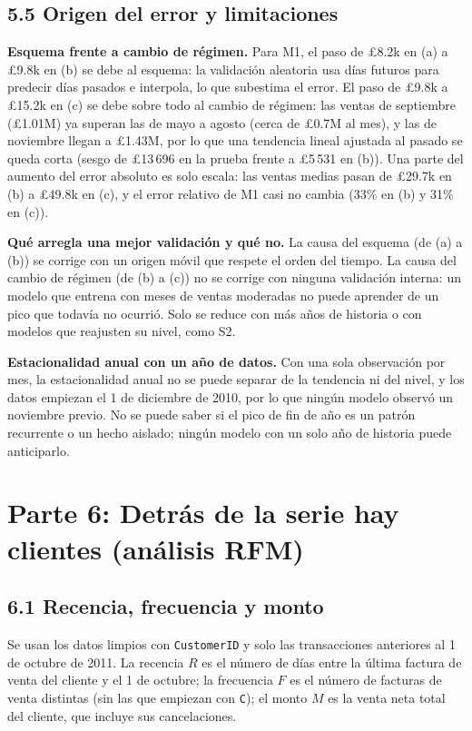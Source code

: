 \documentclass[11pt]{article}
\begin{document}
\subsection*{5.5 Origen del error y limitaciones}
\textbf{Esquema frente a cambio de régimen.} Para M1, el paso de \pounds{}8.2k en (a) a \pounds{}9.8k en (b) se debe al esquema: la validación aleatoria usa días futuros para predecir días pasados e interpola, lo que subestima el error. El paso de \pounds{}9.8k a \pounds{}15.2k en (c) se debe sobre todo al cambio de régimen: las ventas de septiembre (\pounds{}1.01M) ya superan las de mayo a agosto (cerca de \pounds{}0.7M al mes), y las de noviembre llegan a \pounds{}1.43M, por lo que una tendencia lineal ajustada al pasado se queda corta (sesgo de \pounds{}13\,696 en la prueba frente a \pounds{}5\,531 en (b)). Una parte del aumento del error absoluto es solo escala: las ventas medias pasan de \pounds{}29.7k en (b) a \pounds{}49.8k en (c), y el error relativo de M1 casi no cambia (33\% en (b) y 31\% en (c)).

\textbf{Qué arregla una mejor validación y qué no.} La causa del esquema (de (a) a (b)) se corrige con un origen móvil que respete el orden del tiempo. La causa del cambio de régimen (de (b) a (c)) no se corrige con ninguna validación interna: un modelo que entrena con meses de ventas moderadas no puede aprender de un pico que todavía no ocurrió. Solo se reduce con más años de historia o con modelos que reajusten su nivel, como S2.

\textbf{Estacionalidad anual con un año de datos.} Con una sola observación por mes, la estacionalidad anual no se puede separar de la tendencia ni del nivel, y los datos empiezan el 1 de diciembre de 2010, por lo que ningún modelo observó un noviembre previo. No se puede saber si el pico de fin de año es un patrón recurrente o un hecho aislado; ningún modelo con un solo año de historia puede anticiparlo.

\section*{Parte 6: Detrás de la serie hay clientes (análisis RFM)}

\subsection*{6.1 Recencia, frecuencia y monto}
Se usan los datos limpios con \texttt{CustomerID} y solo las transacciones anteriores al 1 de octubre de 2011. La recencia $R$ es el número de días entre la última factura de venta del cliente y el 1 de octubre; la frecuencia $F$ es el número de facturas de venta distintas (sin las que empiezan con \texttt{C}); el monto $M$ es la venta neta total del cliente, que incluye sus cancelaciones.
\end{document}

